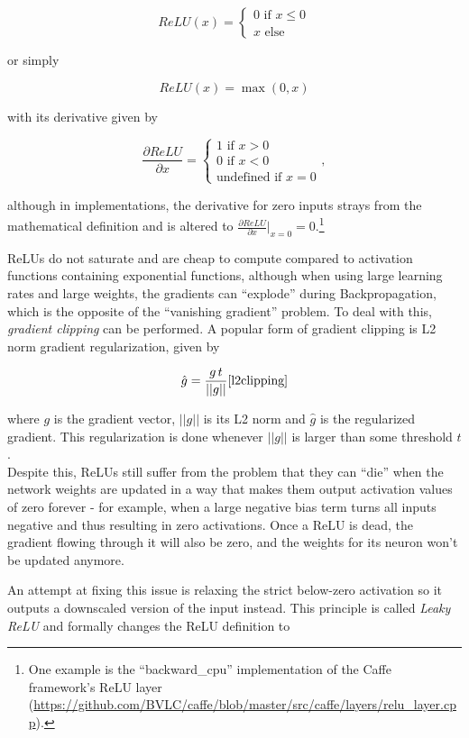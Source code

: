 \[  ReLU(x) = \begin{cases}
			0 \text{ if } x \leq 0\\
			x \text{ else}
		 \end{cases}
\] 

\noindent or simply

\[ ReLU(x) = \max(0, x) \]

\noindent with its derivative given by 

\[ \frac{\partial ReLU}{\partial x} = \begin{cases}
							1 \text { if } x > 0\\
							0 \text { if } x < 0\\
							 \text{undefined if } x = 0
						        \end{cases},
\]

\noindent although in implementations, the derivative for zero inputs strays from the mathematical definition and is altered to $\frac{\partial ReLU}{\partial x}\rvert_{x=0} = 0$.\footnote{One example is the ``backward\_cpu'' implementation of the Caffe framework's ReLU layer (\url{https://github.com/BVLC/caffe/blob/master/src/caffe/layers/relu_layer.cpp}).}

ReLUs do not saturate and are cheap to compute compared to activation functions containing exponential functions, although when using large learning rates and large weights, the gradients can ``explode'' during Backpropagation, which is the opposite of the ``vanishing gradient'' problem. To deal with this, \textit{gradient clipping} can be performed. A popular form of gradient clipping is L2 norm gradient regularization, given by

\[ \hat{g} = \frac{g\,t}{||g||} \cite{l2clipping} \]

\noindent where $g$ is the gradient vector, $||g||$ is its L2 norm and $\hat{g}$ is the regularized gradient. This regularization is done whenever $||g||$ is larger than some threshold $t$.\\

\noindent Despite this, ReLUs still suffer from the problem that they can ``die'' when the network weights are updated in a way that makes them output activation values of zero forever - for example, when a large negative bias term turns all inputs negative and thus resulting in zero activations. Once a ReLU is dead, the gradient flowing through it will also be zero, and the weights for its neuron won't be updated anymore.

An attempt at fixing this issue is relaxing the strict below-zero activation so it outputs a downscaled version of the input instead. This principle is called \textit{Leaky ReLU} \cite{lrelu} and formally changes the ReLU definition to 

